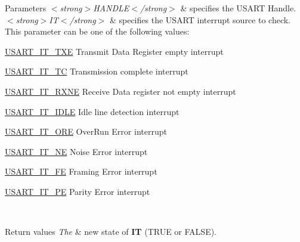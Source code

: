 \begin{DoxyParams}{Parameters}
{\em $<$strong$>$\+H\+A\+N\+D\+L\+E$<$/strong$>$} & specifies the U\+S\+A\+RT Handle. \\
\hline
{\em $<$strong$>$\+I\+T$<$/strong$>$} & specifies the U\+S\+A\+RT interrupt source to check. This parameter can be one of the following values\+: \begin{DoxyItemize}
\item \hyperlink{group___u_s_a_r_t___interrupt__definition_gab18d0fe889204a4c34f6d5817fb5147d}{U\+S\+A\+R\+T\+\_\+\+I\+T\+\_\+\+T\+XE} Transmit Data Register empty interrupt \item \hyperlink{group___u_s_a_r_t___interrupt__definition_ga748e86162cc110513330079982821c39}{U\+S\+A\+R\+T\+\_\+\+I\+T\+\_\+\+TC} Transmission complete interrupt \item \hyperlink{group___u_s_a_r_t___interrupt__definition_gacdd49b93072655a21a63a35e6431f8ae}{U\+S\+A\+R\+T\+\_\+\+I\+T\+\_\+\+R\+X\+NE} Receive Data register not empty interrupt \item \hyperlink{group___u_s_a_r_t___interrupt__definition_ga5d85aab24b7b2dfddb61ba2a49fa6185}{U\+S\+A\+R\+T\+\_\+\+I\+T\+\_\+\+I\+D\+LE} Idle line detection interrupt \item \hyperlink{group___u_s_a_r_t___interrupt__definition_ga8b7d40e02a81be787fbb325bbe6dfbeb}{U\+S\+A\+R\+T\+\_\+\+I\+T\+\_\+\+O\+RE} Over\+Run Error interrupt \item \hyperlink{group___u_s_a_r_t___interrupt__definition_gad5de042f579b50f1e8643009176486b3}{U\+S\+A\+R\+T\+\_\+\+I\+T\+\_\+\+NE} Noise Error interrupt \item \hyperlink{group___u_s_a_r_t___interrupt__definition_ga9af8790f78f6cb1591506c57d0cc0fb3}{U\+S\+A\+R\+T\+\_\+\+I\+T\+\_\+\+FE} Framing Error interrupt \item \hyperlink{group___u_s_a_r_t___interrupt__definition_gae607c28a462c224c575b7541dc4f7067}{U\+S\+A\+R\+T\+\_\+\+I\+T\+\_\+\+PE} Parity Error interrupt \end{DoxyItemize}
\\
\hline
\end{DoxyParams}

\begin{DoxyRetVals}{Return values}
{\em The} & new state of {\bfseries IT} (T\+R\+UE or F\+A\+L\+SE). \\
\hline
\end{DoxyRetVals}
\mbox{\label{group___u_s_a_r_t___exported___macros_ga78be92ca3073a9029f4696dc2fbb7b71}} 
